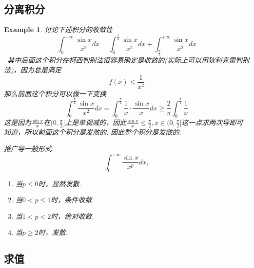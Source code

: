 \documentclass{article}
\newtheorem{example}[theorem]{Example}
\newcommand{\hints}{{\color{blue} \text{hints}}}
\begin{document}
\subsection{分离积分}

\begin{example}
\rm 讨论下述积分的收敛性
$$
\int_0^{+\infty} \frac{\sin x}{x^2}dx  = \int_0^{\frac{\pi}{2}} \frac{\sin x}{x^2}dx + \int_{\frac{\pi}{2}}^{+\infty} \frac{\sin x}{x^2}dx
$$
\hints\ 其中后面这个积分在柯西判别法很容易确定是收敛的(实际上可以用狄利克雷判别法)，因为总是满足
$$
f(x) \leq  \frac{1}{x^2}
$$
那么前面这个积分可以做一下变换
$$
\int_0^{\frac{\pi}{2}} \frac{\sin x}{x^2}dx =  \int_0^{\frac{\pi}{2}}  \frac{1}{x} \cdot \frac{\sin x}{x}dx \geq \frac{2}{\pi} \int_0^{\frac{\pi}{2}}  \frac{1}{x}
$$
这是因为$\frac{\sin x}{x}$在$(0,\frac{\pi}{2}]$上是单调减的，因此$\frac{\sin x}{x} \leq \frac{\pi}{2}, x \in (0,\frac{\pi}{2}]$这一点求两次导即可知道，所以前面这个积分是发散的. 因此整个积分是发散的.  

推广导一般形式
$$
\int_0^{+\infty} \frac{\sin x}{x^p}dx, 
$$
\begin{enumerate}
 \item 当$p \leq 0$时，显然发散.
 \item 当$0 < p \leq 1$时，条件收敛.
 \item 当$1 < p < 2$时，绝对收敛.
 \item 当$p \geq 2$时，发散.
\end{enumerate}
\end{example}

\subsection{求值}
\end{document}
